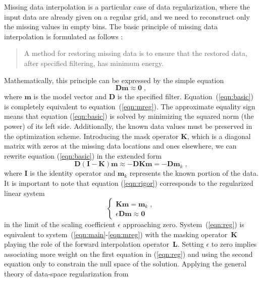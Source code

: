 Missing data interpolation is a particular case of data
regularization, where the input data are already given on a regular
grid, and we need to reconstruct only the missing values in empty
bins.  The basic principle of missing data interpolation is formulated
as follows \cite[]{Claerbout.blackwell.92}:
\begin{quote}
  A method for restoring missing data is to ensure that the restored
  data, after specified filtering, has minimum energy.
\end{quote}
Mathematically, this principle can be expressed by the simple
equation
\begin{equation}
\mathbf{D m \approx 0}\;,
\label{eqn:basic}
\end{equation}
where $\mathbf{m}$ is the model vector and $\mathbf{D}$ is the specified
filter.  Equation~(\ref{eqn:basic}) is completely equivalent to
equation~(\ref{eqn:mreg}).  The approximate equality sign means that
equation (\ref{eqn:basic}) is solved by minimizing the squared norm
(the power) of its left side.  Additionally, the known data values
must be preserved in the optimization scheme. Introducing the mask
operator $\mathbf{K}$, which is a diagonal matrix with
zeros at the missing data locations and ones elsewhere, we can rewrite
equation (\ref{eqn:basic}) in the extended form
\begin{equation}
\mathbf{D (I-K) m} \approx - \mathbf{D K m} = - \mathbf{D m}_k\;,
\label{eqn:rigor}
\end{equation}
where $\mathbf{I}$ is the identity operator and $\mathbf{m}_k$
represents the known portion of the data. It is important to note that
equation (\ref{eqn:rigor}) corresponds to the
regularized linear system
\begin{equation}
\left\{\begin{array}{l}
\mathbf{K m} = \mathbf{m}_k\;, \\
\epsilon \mathbf{D m} \approx \mathbf{0}
\end{array}\right.
\label{eqn:reg}
\end{equation}
in the limit of the scaling coefficient $\epsilon$ approaching zero.
System~(\ref{eqn:reg}) is equivalent to
system~(\ref{eqn:main}-\ref{eqn:mreg}) with the masking
operator~$\mathbf{K}$ playing the role of the forward interpolation
operator~$\mathbf{L}$. Setting $\epsilon$ to zero implies associating
more weight on the first equation in (\ref{eqn:reg}) and using the
second equation only to constrain the null space of the solution.
Applying the general theory of data-space regularization from
